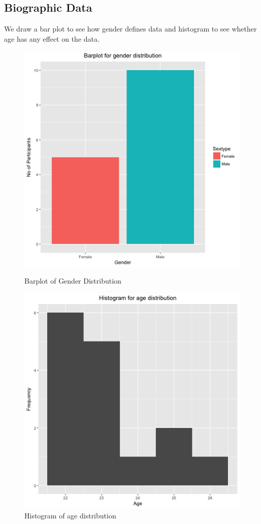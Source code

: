 \documentclass[12pt,epsf]{report}
\begin{document}
\subsection*{Biographic Data}
We draw a bar plot to see how gender defines data and histogram to see whether age has any effect on the data.\\
\begin{figure}[!ht]
	\begin{minipage}[c]{0.5\linewidth}
	\includegraphics[width=\linewidth]{qc_gender}
	\caption{Barplot of Gender Distribution}
	\end{minipage}
	\hfill
	\begin{minipage}[c]{0.5\linewidth}
	\includegraphics[width=\linewidth]{qc_age}
	\caption{Histogram of age distribution}
	\end{minipage}
\end{figure}
\end{document}
